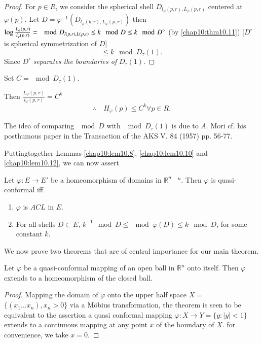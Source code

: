 \begin{proof}
  For $p \in R$, we consider the spherical shell $D_{l_\varphi(p, r),
    L_\varphi (p, r)}$ centered at $\varphi (p)$. Let $D=
  \varphi^{-1}(D_{l_\varphi (b, r), L_\varphi (p, r)})$ then $\log
  \frac{L_\varphi (p, r)}{l_\varphi (p, r)}=\break \mod D_{l(p, r), L(p, r)}
  \leq k \mod D \leq k \mod D^\circ$ (by \ref{chap10:thm10.11})
       [$D^\circ$ is spherical symmetrization of $D$]
       $$
       \leq k \mod D_\tau (1).
       $$
       Since $D^\circ$ \textit{separates the boundaries of} $D_\tau (1)$.
\end{proof}

Set $C= \mod D_\tau (1)$.

Then \quad $\frac{L_\varphi (p, r)}{l_\varphi (p, r)} = C^k$
$$
\therefore \quad H_\varphi (p) \leq C^k \forall p \in R.
$$

\begin{note}
  The idea of comparing $\mod D$ with $\mod D_\tau (1)$ is due to
  $A$. Mori cf. his posthumous paper in the Transaction of the AKS
  V. 84 (1957) pp. 56-77.
\end{note}

Putting\pageoriginale together Lemmas \ref{chap10:lem10.8},
\ref{chap10:lem10.10} and \ref{chap10:lem10.12}, we can now assert 

\begin{thm} \label{chap10:thm10.13}
  Let $\varphi : E \to E'$ be a homeomorphism of domains in
  $\mathbb{R}^n$~ ${}^n$. Then $\varphi$ is quasi-conformal iff
  \begin{enumerate}[(1)]
    \item $\varphi$ is $ACL$ in $E$.
      \item For all shells $D \subset E$, $k^{-1}\mod D \leq \mod
        \varphi (D) \leq k \mod D$, for some constant $k$. 
  \end{enumerate}
\end{thm}

  We now prove two theorems that are of central importance for our
  main theorem.

\begin{thm} \label{chap10:thm10.14}
  Let $\varphi$ be a quasi-conformal mapping of an open ball in
  $\mathbb{R}^n$ onto itself. Then $\varphi$ extends to a
  homeomorphism of the closed ball.
\end{thm}

\begin{proof}
  Mapping the domain of $\varphi$ onto the upper half space $X=$\break $\{
  (x_1\ldots x_n), x_n > 0 \}$ via a M\"obius transformation, the
  theorem is seen to be equivalent to the assertion a quasi conformal
  mapping $\varphi : X \to Y= \{ y: |y|< 1\}$ extends to a continuous
  mapping at any point $x$ of the boundary of $X$. for convenience, we
  take $x=0$.
\end{proof}

